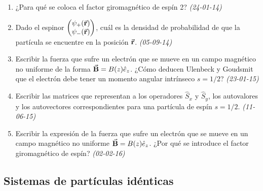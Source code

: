 \begin{enumerate}
    
    
    \item ¿Para qué se coloca el factor giromagnético de espín 2? \textit{(24-01-14)}
    
    \item Dado el espinor $\pmqty{ \psi_{+} (\va{r}) \\ \psi_{-} (\va{r}) }$, cuál es la densidad de probabilidad de que la partícula se encuentre en la posición $\va{r}$. \textit{(05-09-14)}
    
    \item Escribir la fuerza que sufre un electrón que se mueve en un campo magnético no uniforme de la forma $\va{B} = B(z) \hat{e}_z$. ¿Cómo deducen Ulenbeck y Goudsmit que el electrón debe tener un momento angular intrínseco $s = 1/2$? \textit{(23-01-15)}

    \item Escribir las matrices que representan a los operadores $\hat{S}_x$ y $\hat{S}_y$, los autovalores y los autovectores correspondientes para una partícula de espín $s = 1/2$. \textit{(11-06-15)}

    \item Escribir la expresión de la fuerza que sufre un electrón que se mueve en un campo magnético no uniforme $\va{B} = B(z) \hat{e}_z$. ¿Por qué se introduce el factor giromagnético de espín? \textit{(02-02-16)}


\end{enumerate}

\subsection*{Sistemas de partículas idénticas}

